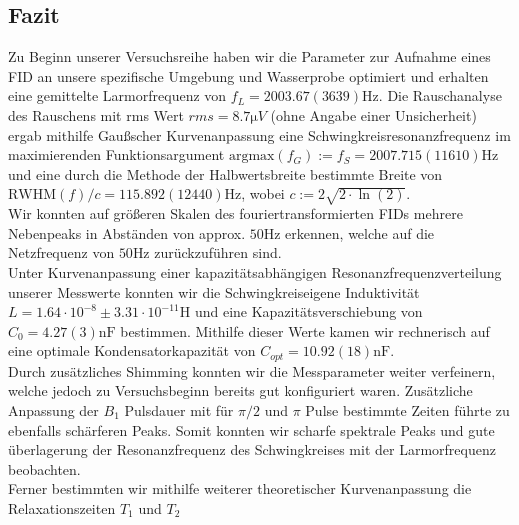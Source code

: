 \documentclass[../Zusammenfassung/main.tex]{subfiles}
\begin{document}
    \subsection{Fazit}
        Zu Beginn unserer Versuchsreihe haben wir die Parameter zur Aufnahme eines FID an unsere spezifische Umgebung und Wasserprobe optimiert und erhalten eine gemittelte Larmorfrequenz von $f_L = 2003.67(3639)\si{\hertz}$. Die Rauschanalyse des Rauschens mit rms Wert $\textit{rms}=8.7\si{\micro V}$ (ohne Angabe einer Unsicherheit) ergab mithilfe Gaußscher Kurvenanpassung eine Schwingkreisresonanzfrequenz im maximierenden Funktionsargument $\text{argmax}(f_G):=f_S = 2007.715(11610)\si{\hertz}$ und eine durch die Methode der Halbwertsbreite bestimmte Breite von $\text{RWHM}(f)/c = 115.892(12440)\si{\hertz}$, wobei $c:=2\sqrt{2\cdot\ln(2)}$. \\
        Wir konnten auf größeren Skalen des fouriertransformierten FIDs mehrere Nebenpeaks in Abständen von approx. $50\si{\hertz}$ erkennen, welche auf die Netzfrequenz von $50\si{\hertz}$ zurückzuführen sind. \\

        Unter Kurvenanpassung einer kapazitätsabhängigen Resonanzfrequenzverteilung unserer Messwerte konnten wir die Schwingkreiseigene Induktivität $L = 1.64\cdot 10^{-8}\pm3.31\cdot 10^{-11}\si{\henry}$ und eine Kapazitätsverschiebung von $C_0 = 4.27(3)\si{\nano\farad}$ bestimmen. Mithilfe dieser Werte kamen wir rechnerisch auf eine optimale Kondensatorkapazität von $C_{opt} = 10.92(18)\si{\nano\farad}$. \\
        Durch zusätzliches Shimming konnten wir die Messparameter weiter verfeinern, welche jedoch zu Versuchsbeginn bereits gut konfiguriert waren. Zusätzliche Anpassung der $B_1$ Pulsdauer mit für $\pi/2$ und $\pi$ Pulse bestimmte Zeiten führte zu ebenfalls schärferen Peaks. Somit konnten wir scharfe spektrale Peaks und gute überlagerung der Resonanzfrequenz des Schwingkreises mit der Larmorfrequenz beobachten. \\
        
        Ferner bestimmten wir mithilfe weiterer theoretischer Kurvenanpassung die Relaxationszeiten $T_1$ und $T_2$
\end{document}
